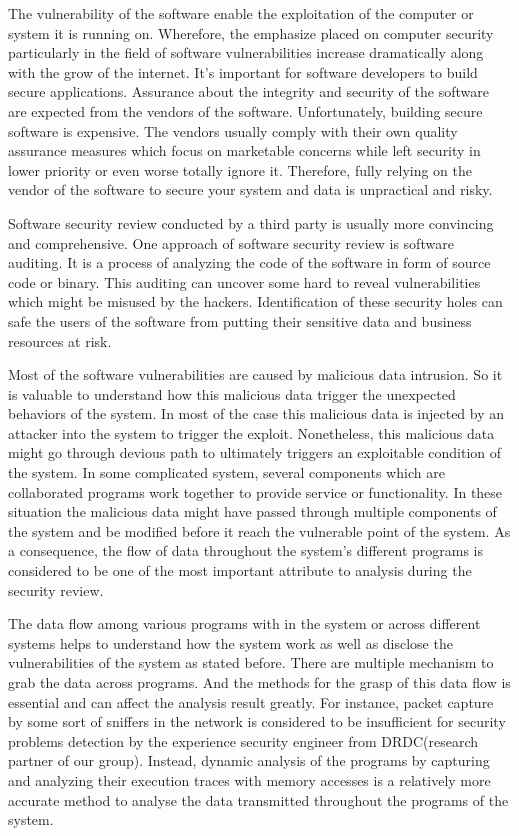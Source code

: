 \label{chapter:introduction}
The vulnerability of the software enable the exploitation of the computer or system it is running on. Wherefore, the emphasize placed on computer security particularly in the field of software vulnerabilities increase dramatically along with the grow of the internet. It's important for software developers to build secure applications. Assurance about the integrity and security of the software are expected from the vendors of the software. Unfortunately, building secure software is expensive. The vendors usually comply with their own quality assurance measures which focus on marketable concerns while left security in lower priority or even worse totally ignore it. Therefore, fully relying on the vendor of the software to secure your system and data is unpractical and risky.

Software security review conducted by a third party is usually more convincing and comprehensive. One approach of software security review is software auditing. It is a process of analyzing the code of the software in form of source code or binary. This auditing can uncover some hard to reveal vulnerabilities which might be misused by the hackers. Identification of these security holes can safe the users of the software from putting their sensitive data and business resources at risk.

Most of the software vulnerabilities are caused by malicious data intrusion. So it is valuable to understand how this malicious data trigger the unexpected behaviors of the system. In most of the case this malicious data is injected by an attacker into the system to trigger the exploit. Nonetheless, this malicious data might go through devious path to ultimately triggers an exploitable condition of the system. In some complicated system, several components which are collaborated programs work together to provide service or functionality. In these situation the malicious data might have passed through multiple components of the system and be modified before it reach the vulnerable point of the system. As a consequence, the flow of data throughout the system's different programs is considered to be one of the most important attribute to analysis during the security review.\cite{dowd_art_2006}

The data flow among various programs with in the system or across different systems helps to understand how the system work as well as disclose the vulnerabilities of the system as stated before. There are multiple mechanism to grab the data across programs. And the methods for the grasp of this data flow is essential and can affect the analysis result greatly. For instance, packet capture by some sort of sniffers in the network is considered to be insufficient for security problems detection by the experience security engineer from DRDC(research partner of our group). Instead, dynamic analysis of the programs by capturing and analyzing their execution traces with memory accesses is a relatively more accurate method to analyse the data transmitted throughout the programs of the system. 

